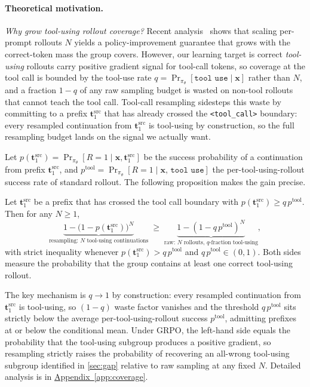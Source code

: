 \documentclass{llmxive}
\providecommand{\bm}[1]{\boldsymbol{#1}}
\providecommand{\appref}[1]{\hyperref[#1]{Appendix~\ref*{#1}}}
\providecommand{\toolcall}{\texttt{<tool\_call>}\xspace}
\providecommand{\Toolresample}{Tool-call resampling\xspace}
\providecommand{\vt}{{\bm{t}}}
\providecommand{\vx}{{\bm{x}}}
\begin{document}
\paragraph{Theoretical motivation.}
\textit{Why grow tool-using rollout coverage?} Recent analysis~\citep{brorl} shows that scaling per-prompt rollouts $N$ yields a policy-improvement guarantee that grows with the correct-token mass the group covers. 
However, our learning target is correct \emph{tool-using} rollouts carry positive gradient signal for tool-call tokens, so coverage at the tool call is bounded by the tool-use rate $q = \Pr_{\pi_\theta}[\texttt{tool use} \mid \vx]$ rather than $N$, and a fraction $1-q$ of any raw sampling budget is wasted on non-tool rollouts that cannot teach the tool call. \Toolresample sidesteps this waste by committing to a prefix $\vt_1^{\text{src}}$ that has already crossed the \toolcall boundary: every resampled continuation from $\vt_1^{\text{src}}$ is tool-using by construction, so the full resampling budget lands on the signal we actually want.

Let $p(\vt_1^{\text{src}}) = \Pr_{\pi_\theta}[R=1 \mid \vx, \vt_1^{\text{src}}]$ be the success probability of a continuation from prefix $\vt_1^{\text{src}}$, and $p^{\text{tool}} = \Pr_{\pi_\theta}[R=1 \mid \vx,\, \texttt{tool use}]$ the per-tool-using-rollout success rate of standard rollout. The following proposition makes the gain precise.

\begin{proposition}
\label{prop:branching}
Let $\vt_1^{\text{src}}$ be a prefix that has crossed the tool call boundary with $p(\vt_1^{\text{src}}) \geq q\, p^{\text{tool}}$. Then for any $N \geq 1$,
\vspace{-0.05in}
\begin{equation}
    \underbrace{1 - \bigl(1 - p(\vt_1^{\text{src}})\bigr)^N}_{\text{resampling: $N$ tool-using continuations}}
    \;\geq\;
    \underbrace{1 - (1 - q\, p^{\text{tool}})^N}_{\text{raw: $N$ rollouts, $q$-fraction tool-using}},
\end{equation}
with strict inequality whenever $p(\vt_1^{\text{src}}) > q\, p^{\text{tool}}$ and $q\, p^{\text{tool}} \in (0,1)$. Both sides measure the probability that the group contains at least one correct tool-using rollout.
\end{proposition}

The key mechanism is $q \to 1$ by construction: every resampled continuation from $\vt_1^{\text{src}}$ is tool-using, so $(1-q)$ waste factor vanishes and the threshold $q\, p^{\text{tool}}$ sits strictly below the average per-tool-using-rollout success $p^{\text{tool}}$, admitting prefixes at or below the conditional mean. Under GRPO, the left-hand side equals the probability that the tool-using subgroup produces a positive gradient, so resampling strictly raises the probability of recovering an all-wrong tool-using subgroup identified in \autoref{sec:gap} relative to raw sampling at any fixed $N$. Detailed analysis is in \appref{app:coverage}.
\end{document}
